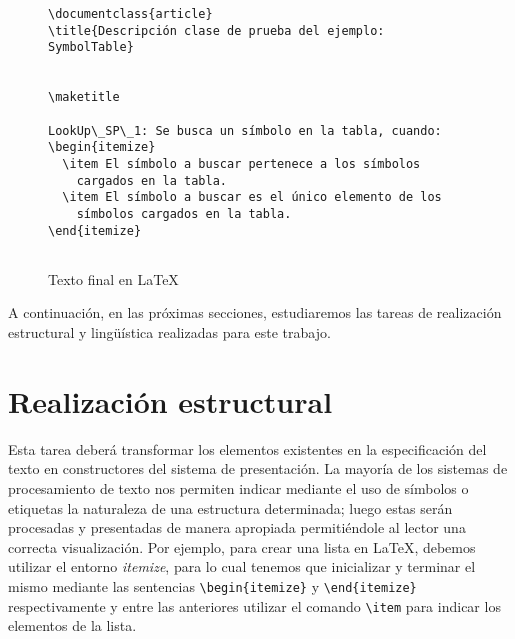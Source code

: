 \begin{figure}[H]
  \begin{verbatim}
\documentclass{article}
\title{Descripción clase de prueba del ejemplo: SymbolTable}


\maketitle

LookUp\_SP\_1: Se busca un símbolo en la tabla, cuando:
\begin{itemize}
  \item El símbolo a buscar pertenece a los símbolos
    cargados en la tabla.
  \item El símbolo a buscar es el único elemento de los
    símbolos cargados en la tabla.  
\end{itemize}


  \end{verbatim}
  \caption{Texto final en \LaTeX}
  \label{fig:ej_latex}
\end{figure}

A continuación, en las próximas secciones, estudiaremos las tareas de realización estructural y lingüística realizadas para este trabajo.

\section{Realización estructural}
\label{cap:structure_realization}


Esta tarea deberá transformar los elementos existentes en la especificación del texto en constructores del sistema de presentación. La mayoría de los sistemas de procesamiento de texto nos permiten indicar mediante el uso de símbolos o etiquetas la naturaleza de una estructura determinada; luego estas serán procesadas y presentadas de manera apropiada permitiéndole al lector una correcta visualización. Por ejemplo, para crear una lista en \LaTeX, debemos utilizar el entorno \emph{itemize}, para lo cual tenemos que inicializar y terminar el mismo mediante las sentencias \verb|\begin{itemize}| y \verb|\end{itemize}| respectivamente y entre las anteriores utilizar el comando \verb|\item| para indicar los elementos de la lista.

